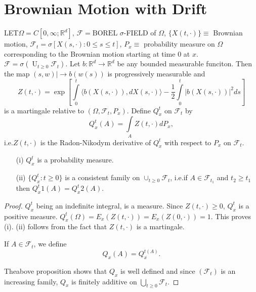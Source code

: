 \chapter{Brownian Motion with Drift}\label{chap20}

LET\pageoriginale $\Omega=C[0,\infty;\mathbb{R}^{d}]$,
$\mathscr{F}=\text{BOREL}$ $\sigma$-FIELD of $\Omega$,
$\{X(t,\cdot)\}\equiv$ Brownian motion,
$\mathscr{F}_{t}=\sigma[X(s,\cdot):0\leq s\leq t]$, $P_{x}\equiv$
probability measure on $\Omega$ corresponding to the Brownian motion
starting at time $0$ at
$x$. $\mathscr{F}=\sigma({\displaystyle{\mathop{U}_{t\geq
      0}}}\mathscr{F}_{t})$. Let $b:\mathbb{R}^{d}\to \mathbb{R}^{d}$
be any bounded measurable funciton. Then the map $(s,w)|\to b(w(s))$
is progressively measurable and 
$$
Z(t,\cdot)=\exp[\int\limits^{t}_{0}\langle
  b(X(s,\cdot)),dX(s,\cdot)\rangle-\frac{1}{2}\int\limits^{t}_{0}|b(X(s,\cdot))|^{2}ds]
$$
is a martingale relative to $(\Omega,\mathscr{F}_{t},P_{x})$. Define
$Q^{t}_{x}$ on $\mathscr{F}_{t}$ by
$$
Q^{t}_{x}(A)=\int\limits_{A}Z(t,\cdot) dP_{x},
$$
i.e.\@ $Z(t,\cdot)$ is the Radon-Nikodym derivative of $Q^{t}_{x}$
with respect to $P_{x}$ on $\mathscr{F}_{t}$.

\begin{prop*}
\begin{itemize}
\item[\rm(i)] $Q^{t}_{x}$ is a probability measure.

\item[\rm(ii)] $\{Q^{t}_{x}:t\geq 0\}$ is a consistent family on
  ${\displaystyle{\mathop{\cup}_{t\geq 0}}}\mathscr{F}_{t}$, i.e.\@ if
  $A\in \mathscr{F}_{t_{1}}$ and $t_{2}\geq t_{1}$ then
  $Q^{t}_{x}1(A)=Q^{t}_{x}2(A)$. 
\end{itemize}
\end{prop*}

\begin{proof}
$Q^{t}_{x}$ being an indefinite integral, is a measure. Since
  $Z(t,\cdot)\geq 0$, $Q^{t}_{x}$ is a positive
  measure. $Q^{t}_{x}(\Omega)=E_{x}(Z(t,\cdot))=E_{x}(Z(0,\cdot))=1$. This
  proves (i). (ii) follows from the fact that $Z(t,\cdot)$ is a
  martingale.

If $A\in \mathscr{F}_{t}$, we define
$$
Q_{x}(A)=Q^{t(A)}_{x}.
$$

The\pageoriginale above proposition shows that $Q_{x}$ is well defined
and since $(\mathscr{F}_{t})$ is an increasing family, $Q_{x}$ is
finitely additive on $\bigcup\limits_{t\geq
      0}\mathscr{F}_{t}$. 
\end{proof}

